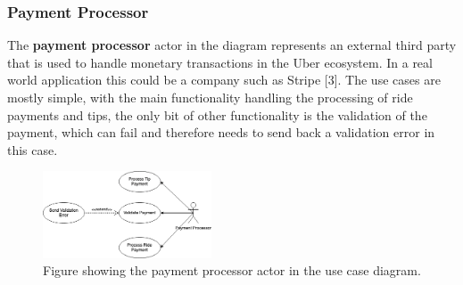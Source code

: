 \documentclass{article}
\begin{document}
    \newpage
    \subsubsection{Payment Processor}
      The \textbf{payment processor} actor in the diagram represents an external third party that is used to handle monetary transactions in the Uber ecosystem.
      In a real world application this could be a company such as Stripe [3]. The use cases are mostly simple, with the main functionality handling the processing of 
      ride payments and tips, the only bit of other functionality is the validation of the payment, which can fail and therefore needs to send back a 
      validation error in this case.

      \begin{figure}[H]
        \centering
        \includegraphics[width=5cm]{assets/pp_use_case.drawio.png}
        \caption{Figure showing the payment processor actor in the use case diagram.}
        \label{fig:ppUseCase}
      \end{figure}
\end{document}
